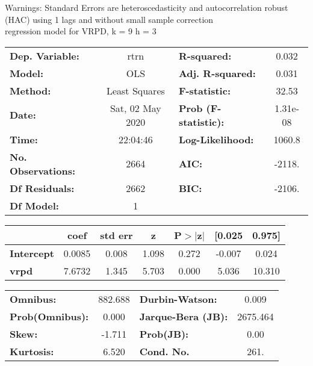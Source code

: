 Warnings: \newline
 [1] Standard Errors are heteroscedasticity and autocorrelation robust (HAC) using 1 lags and without small sample correction\\ 

regression model for VRPD, k = 9 h = 3\begin{center}
\begin{tabular}{lclc}
\toprule
\textbf{Dep. Variable:}    &       rtrn       & \textbf{  R-squared:         } &     0.032   \\
\textbf{Model:}            &       OLS        & \textbf{  Adj. R-squared:    } &     0.031   \\
\textbf{Method:}           &  Least Squares   & \textbf{  F-statistic:       } &     32.53   \\
\textbf{Date:}             & Sat, 02 May 2020 & \textbf{  Prob (F-statistic):} &  1.31e-08   \\
\textbf{Time:}             &     22:04:46     & \textbf{  Log-Likelihood:    } &    1060.8   \\
\textbf{No. Observations:} &        2664      & \textbf{  AIC:               } &    -2118.   \\
\textbf{Df Residuals:}     &        2662      & \textbf{  BIC:               } &    -2106.   \\
\textbf{Df Model:}         &           1      & \textbf{                     } &             \\
\bottomrule
\end{tabular}
\begin{tabular}{lcccccc}
                   & \textbf{coef} & \textbf{std err} & \textbf{z} & \textbf{P$> |$z$|$} & \textbf{[0.025} & \textbf{0.975]}  \\
\midrule
\textbf{Intercept} &       0.0085  &        0.008     &     1.098  &         0.272        &       -0.007    &        0.024     \\
\textbf{vrpd}      &       7.6732  &        1.345     &     5.703  &         0.000        &        5.036    &       10.310     \\
\bottomrule
\end{tabular}
\begin{tabular}{lclc}
\textbf{Omnibus:}       & 882.688 & \textbf{  Durbin-Watson:     } &    0.009  \\
\textbf{Prob(Omnibus):} &   0.000 & \textbf{  Jarque-Bera (JB):  } & 2675.464  \\
\textbf{Skew:}          &  -1.711 & \textbf{  Prob(JB):          } &     0.00  \\
\textbf{Kurtosis:}      &   6.520 & \textbf{  Cond. No.          } &     261.  \\
\bottomrule
\end{tabular}
\end{center}

